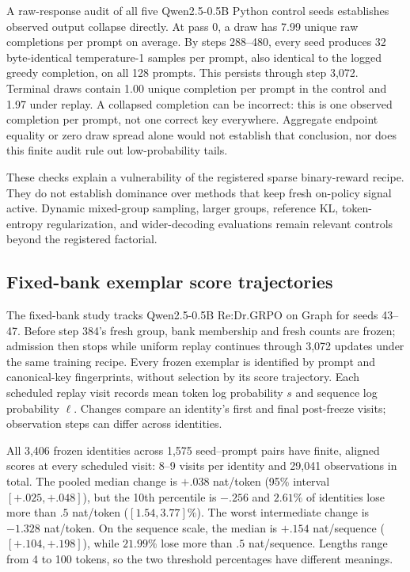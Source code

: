 \documentclass{article}
\newcommand{\1}{\mathbf 1}
\theoremstyle{remark}
\theoremstyle{definition}
\theoremstyle{plain}
\begin{document}
A raw-response audit of all five Qwen2.5-0.5B Python control seeds establishes
observed output collapse directly. At pass 0, a draw has 7.99 unique raw
completions per prompt on average. By steps 288--480, every seed produces
32 byte-identical temperature-1 samples per prompt, also identical to the
logged greedy completion, on all 128 prompts. This persists through step
3,072. Terminal draws contain 1.00 unique completion per prompt in the
control and 1.97 under replay. A collapsed completion can be incorrect:
this is one observed completion per prompt, not one correct key everywhere.
Aggregate endpoint equality or zero draw spread alone would not establish
that conclusion, nor does this finite audit rule out low-probability tails.

These checks explain a vulnerability of the registered sparse binary-reward
recipe. They do not establish dominance over methods that keep fresh
on-policy signal active. Dynamic mixed-group sampling, larger groups,
reference KL, token-entropy regularization, and wider-decoding evaluations
remain relevant controls beyond the registered factorial.

\subsection{Fixed-bank exemplar score trajectories}
\label{app:fixed-bank-survival}

The fixed-bank study tracks Qwen2.5-0.5B Re:Dr.GRPO on Graph for seeds
43--47. Before step 384's fresh group, bank membership and fresh counts
are frozen; admission then stops while uniform replay continues through
3,072 updates under the same training recipe. Every frozen exemplar is
identified by prompt and canonical-key fingerprints, without selection by
its score trajectory. Each scheduled replay visit records mean token log
probability $s$ and sequence log probability $\ell$. Changes compare an
identity's first and final post-freeze visits; observation steps can differ
across identities.

All 3,406 frozen identities across 1,575 seed--prompt pairs have finite,
aligned scores at every scheduled visit: 8--9 visits per identity and
29,041 observations in total. The pooled median change is $+.038$
nat/token (95\% interval $[+.025,+.048]$), but the 10th percentile is
$-.256$ and $2.61\%$ of identities lose more than $.5$ nat/token
($[1.54,3.77]\%$). The worst intermediate change is $-1.328$ nat/token.
On the sequence scale, the median is $+.154$ nat/sequence
($[+.104,+.198]$), while $21.99\%$ lose more than $.5$ nat/sequence.
Lengths range from 4 to 100 tokens, so the two threshold percentages have
different meanings.
\end{document}
